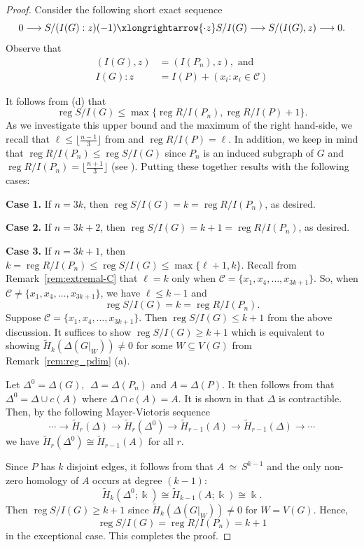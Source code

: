 \documentclass[12pt]{amsart}
\theoremstyle{plain}
\theoremstyle{definition}
\DeclareMathOperator{\reg}{reg}
\begin{document}
\begin{proof}
    Consider the following short exact sequence
$$0 \longrightarrow S/(I(G):z) (-1) \xlongrightarrow{ \cdot z} S/I(G) \longrightarrow S/(I(G),z)  \longrightarrow  0.$$
Observe that  
\begin{align*}
 (I(G),z) & =  (I(P_n),z), \text{ and } \\
 I(G):z & =  I(P) + (x_i : x_i \in \mathcal{C})
\end{align*}

  
 It follows from  (d) that
 $$\reg S/ I(G) \leq \max\{ \reg R/I(P_n), \reg R/I(P)+1 \}.$$
As we investigate this upper bound and the maximum of the right hand-side, we recall that   $\ell \leq \lfloor \frac{n-1}{3} \rfloor$ from  and $\reg R/I(P)=\ell$. In addition, we keep in mind that $ \reg R/I(P_n) \leq \reg S/I(G)$ since $P_n$ is an induced subgraph of $G$ and $\reg R/I(P_n)= \lfloor \frac{n+1}{3} \rfloor$ (see \cite[Theorem 4.7]{Selvi_cycles}).  Putting these together results with the following cases:
 
 \textbf{Case 1.} If $n=3k$, then $\reg S/I(G)=  k= \reg R/I(P_n)$, as desired.
 
 
 \textbf{Case 2.}  If $n=3k+2$, then $\reg S/I(G)=  k+1= \reg R/I(P_n)$, as desired.

 
 \textbf{Case 3.}  If $n=3k+1$, then  $k=\reg R/I(P_n)\leq \reg S/I(G) \leq \max\{\ell+1, k\}$.  Recall from Remark~\ref{rem:extremal-C} that $\ell=k$ only when $\mathcal{C}=\{x_1,x_4,\ldots, x_{3k+1}\}$. So,  when $\mathcal{C} \neq \{x_1,x_4,\ldots, x_{3k+1}\} $, we have  $\ell \leq k-1$ and
    $$\reg S/I(G)= k =\reg R/I(P_n).$$
Suppose $\mathcal{C} =\{x_1,x_4,\ldots, x_{3k+1}\} $.  Then  $\reg S/I(G)\leq k+1$ from the above discussion. It suffices to show $\reg S/I(G)\geq k+1$ which is equivalent to showing $\widetilde{H}_k (\Delta(G|_W)) \neq 0$ for some $W\subseteq V(G)$ from Remark~\ref{rem:reg_pdim} (a).

    Let $\Delta^0= \Delta (G), ~~\Delta=\Delta(P_n)$ and $A=\Delta(P)$. It then follows from   that $\Delta^0= \Delta \cup c(A)$ where $\Delta \cap c(A)=A$. It is shown in \cite[Proposition 4.6]{KozlovInd} that $\Delta$ is contractible. Then, by the following Mayer-Vietoris sequence
     $$\cdots   \longrightarrow \widetilde{H}_{r} (\Delta)  \longrightarrow \widetilde{H}_r (\Delta^0) \longrightarrow \widetilde{H}_{r-1} (A) \longrightarrow \widetilde{H}_{r-1} (\Delta) \longrightarrow \cdots
    $$
   we have $\widetilde{H}_r (\Delta^0) \cong \widetilde{H}_{r-1} (A) $ for all $r$. 
   
   
Since $P$ has $k$ disjoint edges, it follows from  that 
\(  A \ \simeq\ S^{k-1}\) and the only non-zero homology of $A$ occurs at degree $(k-1)$:
$$\widetilde H_{k}(\Delta^0;\Bbbk)\cong \widetilde H_{k-1}(A;\Bbbk)\cong  \Bbbk.$$ 
Then  $\reg S/I(G)\geq k+1$ since $\widetilde{H}_k (\Delta(G|_W)) \neq 0$ for $W=V(G)$. Hence, 
$$\reg S/I(G)= \reg R/I(P_n)= k+1$$
 in the exceptional case. This completes the proof.
\end{proof}
\end{document}
